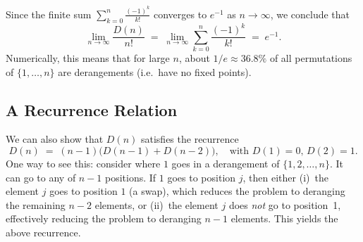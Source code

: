 \documentclass{article}
\begin{document}
Since the finite sum \(\sum_{k=0}^{n} \frac{(-1)^k}{k!}\) converges to \(e^{-1}\) as \(n \to \infty\), we conclude that
\[
\lim_{n\to\infty} \frac{D(n)}{n!} 
\;=\; \lim_{n\to\infty} 
\sum_{k=0}^{n} \frac{(-1)^k}{k!}
\;=\;
e^{-1}.
\]
Numerically, this means that for large \(n\), about \(1/e \approx 36.8\%\) of all permutations of \(\{1,\dots,n\}\) are derangements (i.e.\ have no fixed points).


\subsection*{A Recurrence Relation}
We can also show that $D(n)$ satisfies the recurrence
\[
D(n) \;=\; (n-1)\bigl(D(n-1) + D(n-2)\bigr),
\quad \text{with } D(1)=0, \,D(2)=1.
\]
One way to see this: consider where $1$ goes in a derangement of $\{1,2,\ldots,n\}$. It can go to any of $n-1$ positions. If $1$ goes to position $j$, then either (i)~the element $j$ goes to position $1$ (a swap), which reduces the problem to deranging the remaining $n-2$ elements, or (ii)~the element $j$ does \emph{not} go to position~1, effectively reducing the problem to deranging $n-1$ elements. This yields the above recurrence.
\end{document}
